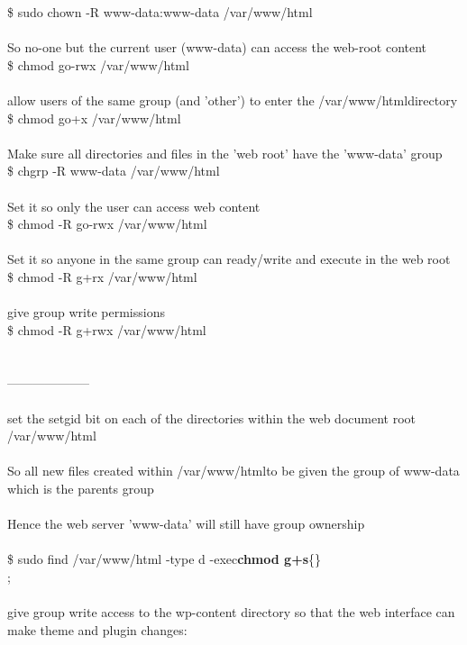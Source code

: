 \documentclass[10pt,a4paper]{article}
\begin{document}
{{{{{{{{{{{{{{{{{{{{\$ sudo chown -R www-data:www-data /var/www/html}{\large \\
\\
So no-one but the current user (www-data) can access the web-root content\\
\$ chmod go-rwx /var/www/html}{\large \\
\\
allow users of the same group (and 'other') to enter the /var/www/html}{\large  directory\\
\$ chmod go+x /var/www/html}{\large \\
\\
Make sure all directories and files in the 'web root' have the 'www-data' group\\
\$ chgrp -R www-data /var/www/html}{\large \\
\\
Set it so only the user can access web content\\
\$ chmod -R go-rwx /var/www/html}{\large \\
\\
Set it so anyone in the same group can ready/write and execute in the web root\\
\$ chmod -R g+rx /var/www/html}{\large \\
\\
give group write permissions\\
\$ chmod -R g+rwx /var/www/html}{\large \\
\\
\\
--------------------\\
\\
set the setgid bit on each of the directories within the web document root /var/www/html}{\large \\
\\
So all new files created within /var/www/html}{\large   to be given the group of www-data which is the parents group\\
\\
Hence  the web server 'www-data' will still have group ownership\\
\\
\$ }sudo find /var/www/html -type d -exec{\large \textbf{chmod g+s}}{\large  \{\}} \\;{\large \\
\\
give group write access to the wp-content directory so that the web interface can make theme and plugin changes:\\
}}}}}}}}}}}}}}}}}}}}
\end{document}
